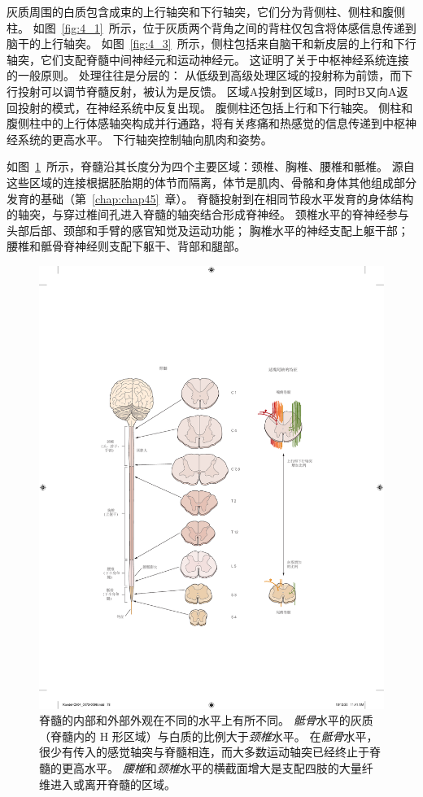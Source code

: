 灰质周围的白质包含成束的上行轴突和下行轴突，它们分为背侧柱、侧柱和腹侧柱。
如图~\ref{fig:4_1}~所示，位于灰质两个背角之间的背柱仅包含将体感信息传递到脑干的上行轴突。
如图~\ref{fig:4_3}~所示，侧柱包括来自脑干和新皮层的上行和下行轴突，它们支配脊髓中间神经元和运动神经元。 
这证明了关于中枢神经系统连接的一般原则。
处理往往是分层的：
从低级到高级处理区域的投射称为前馈，而下行投射可以调节脊髓反射，被认为是反馈。 
区域A投射到区域B，同时B又向A返回投射的模式，在神经系统中反复出现。
腹侧柱还包括上行和下行轴突。 
侧柱和腹侧柱中的上行体感轴突构成并行通路，将有关疼痛和热感觉的信息传递到中枢神经系统的更高水平。 
下行轴突控制轴向肌肉和姿势。


如图~\ref{fig:4_4}~所示，脊髓沿其长度分为四个主要区域：颈椎、胸椎、腰椎和骶椎。
源自这些区域的连接根据胚胎期的体节而隔离，体节是肌肉、骨骼和身体其他组成部分发育的基础（第~\ref{chap:chap45}~章）。 
脊髓投射到在相同节段水平发育的身体结构的轴突，与穿过椎间孔进入脊髓的轴突结合形成脊神经。
颈椎水平的脊神经参与头部后部、颈部和手臂的感官知觉及运动功能；
胸椎水平的神经支配上躯干部；腰椎和骶骨脊神经则支配下躯干、背部和腿部。


\begin{figure}[htbp]
	\centering
	\includegraphics[width=1.0\linewidth]{chap04/fig_4_4}
	\caption{脊髓的内部和外部外观在不同的水平上有所不同。
		\textit{骶骨}水平的灰质（脊髓内的 H 形区域）与白质的比例大于\textit{颈椎}水平。
		在\textit{骶骨}水平，很少有传入的感觉轴突与脊髓相连，而大多数运动轴突已经终止于脊髓的更高水平。
		\textit{腰椎}和\textit{颈椎}水平的横截面增大是支配四肢的大量纤维进入或离开脊髓的区域。}
	\label{fig:4_4}
\end{figure}


